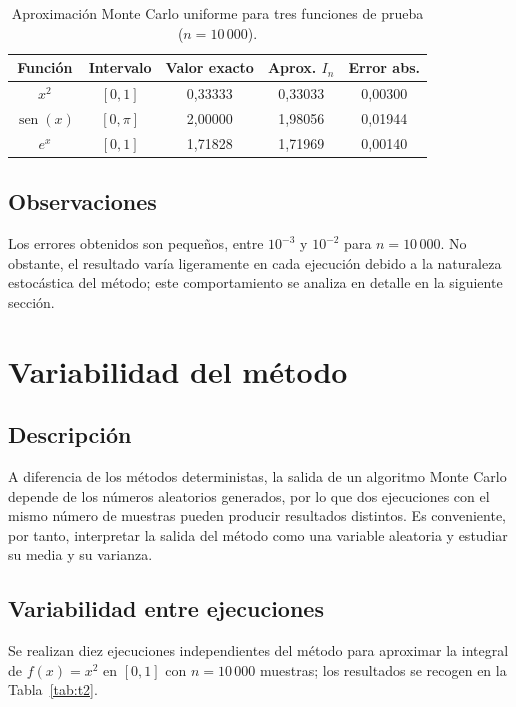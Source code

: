 \documentclass[11pt,a4paper]{article}
\newcommand{\cab}{\rowcolor{cabecera}}
\begin{document}
\begin{table}[H]
\centering
\caption{Aproximación Monte Carlo uniforme para tres funciones de prueba ($n = 10\,000$).}\label{tab:t1}
\begin{tabular}{ccccc}
\toprule
\cab \textbf{Función} & \textbf{Intervalo} & \textbf{Valor exacto} & \textbf{Aprox. $I_n$} & \textbf{Error abs.}\\
\midrule
$x^2$ & $[0,1]$ & 0,33333 & 0,33033 & 0,00300\\
$\operatorname{sen}(x)$ & $[0,\pi]$ & 2,00000 & 1,98056 & 0,01944\\
$e^x$ & $[0,1]$ & 1,71828 & 1,71969 & 0,00140\\
\bottomrule
\end{tabular}
\end{table}

\subsection{Observaciones}
Los errores obtenidos son pequeños, entre $10^{-3}$ y $10^{-2}$ para $n = 10\,000$. No obstante, el resultado varía ligeramente en cada ejecución debido a la naturaleza estocástica del método; este comportamiento se analiza en detalle en la siguiente sección.

\section{Variabilidad del método}

\subsection{Descripción}
A diferencia de los métodos deterministas, la salida de un algoritmo Monte Carlo depende de los números aleatorios generados, por lo que dos ejecuciones con el mismo número de muestras pueden producir resultados distintos. Es conveniente, por tanto, interpretar la salida del método como una variable aleatoria y estudiar su media y su varianza.

\subsection{Variabilidad entre ejecuciones}
Se realizan diez ejecuciones independientes del método para aproximar la integral de $f(x)=x^2$ en $[0,1]$ con $n = 10\,000$ muestras; los resultados se recogen en la Tabla~\ref{tab:t2}.
\end{document}
